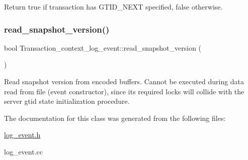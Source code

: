 Return true if transaction has G\+T\+I\+D\+\_\+\+N\+E\+XT specified, false otherwise. \mbox{\label{classTransaction__context__log__event_a8f7b4b4b8d639ab385cf41f80ec3171f}} 
\subsubsection{\texorpdfstring{read\+\_\+snapshot\+\_\+version()}{read\_snapshot\_version()}}
{\footnotesize\ttfamily bool Transaction\+\_\+context\+\_\+log\+\_\+event\+::read\+\_\+snapshot\+\_\+version (\begin{DoxyParamCaption}{ }\end{DoxyParamCaption})}

Read snapshot version from encoded buffers. Cannot be executed during data read from file (event constructor), since its required locks will collide with the server gtid state initialization procedure. 

The documentation for this class was generated from the following files\+:\begin{DoxyCompactItemize}
\item 
\mbox{\hyperlink{log__event_8h}{log\+\_\+event.\+h}}\item 
log\+\_\+event.\+cc\end{DoxyCompactItemize}
